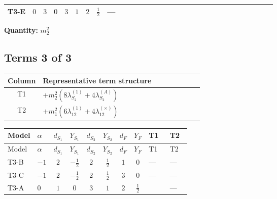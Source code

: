 \documentclass[8pt]{article}
\begin{document}
\begin{landscape}
\begin{longtable}{@{}llcccccc >{\raggedright\arraybackslash}p{0.21\linewidth} >{\raggedright\arraybackslash}p{0.21\linewidth} >{\raggedright\arraybackslash}p{0.21\linewidth}@{}}
\midrule
T3-E & $0$ & $3$ & $0$ & $3$ & $1$ & $2$ & $\frac{1}{2}$ & --- & \scriptsize\adjustbox{max width=\linewidth}{$\begin{gathered} -12 {g_2}^2 {m_2^2}\end{gathered}$} & \scriptsize\adjustbox{max width=\linewidth}{$\begin{gathered} -6 {g_1}^2 {m_2^2}\end{gathered}$} \\
\midrule
\bottomrule
\end{longtable}
\clearpage
\noindent\textbf{Quantity: }$m_2^2$\par\smallskip
\subsection*{Terms 3 of 3}
\begin{center}
\begin{tabular}{@{}c >{\raggedright\arraybackslash}p{0.82\linewidth}@{}}
\toprule
Column & Representative term structure \\
\midrule
T1 & \(\displaystyle +{m_2^2} (8 {\lambda_{S_2}^{(1)}}+4 {\lambda_{S_2}^{(A)}})\) \\
\midrule
T2 & \(\displaystyle +{m_1^2} (6 {\lambda_{12}^{(1)}}+4 {\lambda_{12}^{(\times)}})\) \\
\midrule
\bottomrule
\end{tabular}
\end{center}
\smallskip
\tiny
\begin{longtable}{@{}llcccccc >{\raggedright\arraybackslash}p{0.21\linewidth} >{\raggedright\arraybackslash}p{0.21\linewidth}@{}}
\toprule
Model & $\alpha$ & $d_{S_1}$ & $Y_{S_1}$ & $d_{S_2}$ & $Y_{S_2}$ & $d_F$ & $Y_F$ & T1 & T2 \\
\midrule
\endfirsthead
\toprule
Model & $\alpha$ & $d_{S_1}$ & $Y_{S_1}$ & $d_{S_2}$ & $Y_{S_2}$ & $d_F$ & $Y_F$ & T1 & T2 \\
\midrule
\endhead
T3-B & $-1$ & $2$ & $-\frac{1}{2}$ & $2$ & $\frac{1}{2}$ & $1$ & $0$ & --- & --- \\
\midrule
T3-C & $-1$ & $2$ & $-\frac{1}{2}$ & $2$ & $\frac{1}{2}$ & $3$ & $0$ & --- & --- \\
\midrule
T3-A & $0$ & $1$ & $0$ & $3$ & $1$ & $2$ & $\frac{1}{2}$ & \scriptsize\adjustbox{max width=\linewidth}{$\begin{gathered} +{m_2^2} (8 {\lambda_{S_2}^{(1)}}+4 {\lambda_{S_2}^{(A)}})\end{gathered}$} & --- \\

\end{longtable}
\end{landscape}
\end{document}
